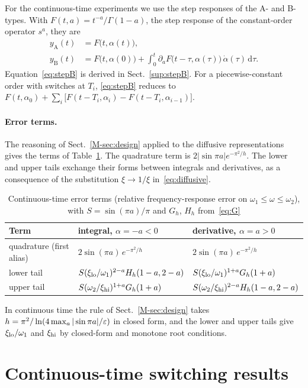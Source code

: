 For the continuous-time experiments we use the step responses of the A- and B-types. With $F(t,a)=t^{-a}/\Gamma(1-a)$, the step response of the constant-order operator $s^{a}$, they are
\begin{align}
y_{\mathrm A}(t) &= F\big(t,\alpha(t)\big), \label{eq:stepA}\\
y_{\mathrm B}(t) &= F\big(t,\alpha(0)\big)+\int_0^t \partial_a F\big(t-\tau,\alpha(\tau)\big)\,\dot\alpha(\tau)\,\mathrm d\tau. \label{eq:stepB}
\end{align}
Equation~\eqref{eq:stepB} is derived in Sect.~\ref{sup:stepB}. For a piecewise-constant order with switches at $T_i$, \eqref{eq:stepB} reduces to $F(t,\alpha_0)+\sum_i\big[F(t-T_i,\alpha_i)-F(t-T_i,\alpha_{i-1})\big]$.

\paragraph{Error terms.} The reasoning of Sect.~\ref{M-sec:design} applied to the diffusive representations gives the terms of Table~\ref{tab:ctterms}. The quadrature term is $2|\sin\pi a|e^{-\pi^2/h}$. The lower and upper tails exchange their forms between integrals and derivatives, as a consequence of the substitution $\xi\to1/\xi$ in~\eqref{eq:diffusive}.

\begin{table}[t]
\caption{Continuous-time error terms (relative frequency-response error on $\omega_1\le\omega\le\omega_2$), with $S=\sin(\pi a)/\pi$ and $G_h$, $H_h$ from~\eqref{eq:G}}\label{tab:ctterms}
\begin{tabular}{@{}lll@{}}
\toprule
Term & integral, $\alpha=-a<0$ & derivative, $\alpha=a>0$\\
\midrule
quadrature (first alias) & $2\sin(\pi a)\,e^{-\pi^2/h}$ & $2\sin(\pi a)\,e^{-\pi^2/h}$\\
lower tail & $S(\xi_{\mathrm{lo}}/\omega_1)^{2-a}H_h(1-a,2-a)$ & $S(\xi_{\mathrm{lo}}/\omega_1)^{1+a}G_h(1+a)$\\
upper tail & $S(\omega_2/\xi_{\mathrm{hi}})^{1+a}G_h(1+a)$ & $S(\omega_2/\xi_{\mathrm{hi}})^{2-a}H_h(1-a,2-a)$\\
\bottomrule
\end{tabular}
\end{table}
In continuous time the rule of Sect.~\ref{M-sec:design} takes $h=\pi^2/\ln(4\max_a|\sin\pi a|/\varepsilon)$ in closed form, and the lower and upper tails give $\xi_{\mathrm{lo}}/\omega_1$ and $\xi_{\mathrm{hi}}$ by closed-form and monotone root conditions.

\section{Continuous-time switching results}\label{sup:ct}
